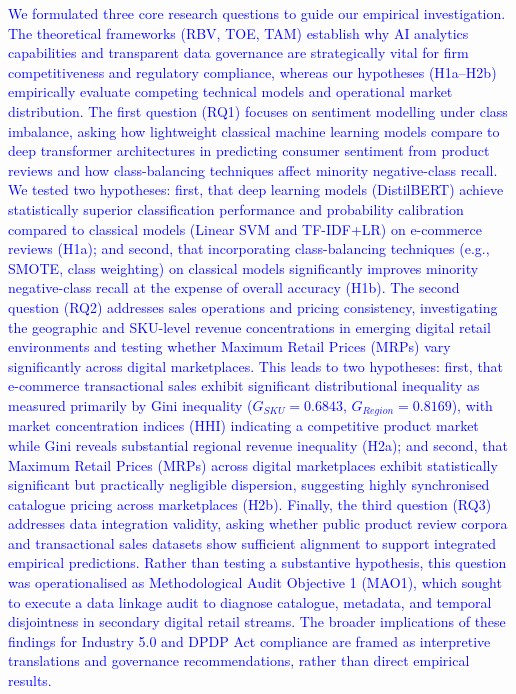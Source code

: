 \documentclass[authoryear,review,3p,times,12pt]{elsarticle}
\newcommand{\update}[1]{\textcolor{blue}{#1}}
\begin{document}
\update{We formulated three core research questions to guide our empirical investigation. The theoretical frameworks (RBV, TOE, TAM) establish why AI analytics capabilities and transparent data governance are strategically vital for firm competitiveness and regulatory compliance, whereas our hypotheses (H1a–H2b) empirically evaluate competing technical models and operational market distribution. The first question (RQ1) focuses on sentiment modelling under class imbalance, asking how lightweight classical machine learning models compare to deep transformer architectures in predicting consumer sentiment from product reviews and how class-balancing techniques affect minority negative-class recall. We tested two hypotheses: first, that deep learning models (DistilBERT) achieve statistically superior classification performance and probability calibration compared to classical models (Linear SVM and TF-IDF+LR) on e-commerce reviews (H1a); and second, that incorporating class-balancing techniques (e.g., SMOTE, class weighting) on classical models significantly improves minority negative-class recall at the expense of overall accuracy (H1b). The second question (RQ2) addresses sales operations and pricing consistency, investigating the geographic and SKU-level revenue concentrations in emerging digital retail environments and testing whether Maximum Retail Prices (MRPs) vary significantly across digital marketplaces. This leads to two hypotheses: first, that e-commerce transactional sales exhibit significant distributional inequality as measured primarily by Gini inequality ($G_{SKU} = 0.6843$, $G_{Region} = 0.8169$), with market concentration indices (HHI) indicating a competitive product market while Gini reveals substantial regional revenue inequality (H2a); and second, that Maximum Retail Prices (MRPs) across digital marketplaces exhibit statistically significant but practically negligible dispersion, suggesting highly synchronised catalogue pricing across marketplaces (H2b). Finally, the third question (RQ3) addresses data integration validity, asking whether public product review corpora and transactional sales datasets show sufficient alignment to support integrated empirical predictions. Rather than testing a substantive hypothesis, this question was operationalised as Methodological Audit Objective 1 (MAO1), which sought to execute a data linkage audit to diagnose catalogue, metadata, and temporal disjointness in secondary digital retail streams. The broader implications of these findings for Industry 5.0 and DPDP Act compliance are framed as interpretive translations and governance recommendations, rather than direct empirical results.}
\end{document}
